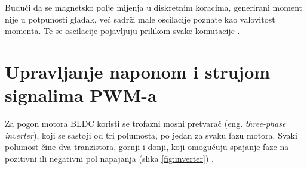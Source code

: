 \documentclass[diplomskirad]{fer}
\begin{document}
Budući da se magnetsko polje mijenja u diskretnim koracima, generirani moment
nije u potpunosti gladak, već sadrži male oscilacije poznate kao valovitost
momenta. Te se oscilacije pojavljuju prilikom svake komutacije \cite{TI2015}.
\label{trap:torque-ripple} 

\newpage
\section{Upravljanje naponom i strujom signalima PWM-a}
\label{sec:trofazno_upravljanje}

Za pogon motora BLDC koristi se trofazni mosni pretvarač (eng.
\textit{three-phase inverter}), koji se sastoji od tri polumosta, po jedan za
svaku fazu motora. Svaki polumost čine dva tranzistora, gornji i donji, koji
omogućuju spajanje faze na pozitivni ili negativni pol napajanja (slika
\ref{fig:inverter}) \cite{TI2015,ST_AN1946,MicrochipAN885}.
\end{document}
